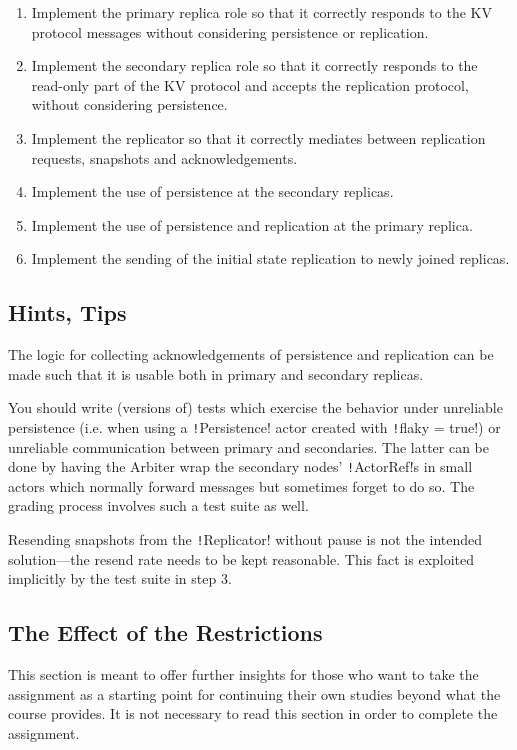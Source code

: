 \documentclass{article}
\begin{document}
\begin{enumerate}
    \item Implement the primary replica role so that it correctly responds to the KV protocol messages without considering persistence or replication.
    \item Implement the secondary replica role so that it correctly responds to the read-only part of the KV protocol and accepts the replication protocol, without considering persistence.
    \item Implement the replicator so that it correctly mediates between replication requests, snapshots and acknowledgements.
    \item Implement the use of persistence at the secondary replicas.
    \item Implement the use of persistence and replication at the primary replica.
    \item Implement the sending of the initial state replication to newly joined replicas.
\end{enumerate}

\subsection{Hints, Tips}

The logic for collecting acknowledgements of persistence and replication can be made such that it is usable both in primary and secondary replicas.

You should write (versions of) tests which exercise the behavior under unreliable persistence (i.e. when using a \texttt!Persistence! actor created with \texttt!flaky = true!) or unreliable communication between primary and secondaries. The latter can be done by having the Arbiter wrap the secondary nodes’ \texttt!ActorRef!s in small actors which normally  forward messages but sometimes forget to do so. The grading process  involves such a test suite as well.

Resending snapshots from the \texttt!Replicator! without  pause is not the intended solution—the resend rate needs to be kept  reasonable. This fact is exploited implicitly by the test suite in step  3.

\subsection{The Effect of the Restrictions}\label{ss:theeffectoftherestrictions}
This section is meant to offer further insights for those who want to  take the assignment as a starting point for continuing their own  studies beyond what the course provides. It is not necessary to read  this section in order to complete the assignment.
\end{document}
